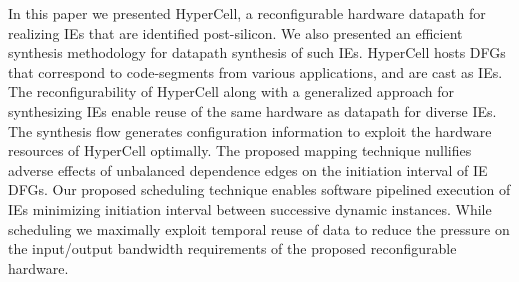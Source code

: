 In this paper we presented HyperCell, a reconfigurable hardware datapath for realizing IEs that are identified post-silicon. We also presented an efficient synthesis methodology for datapath synthesis of such IEs. 
HyperCell hosts DFGs that correspond to code-segments from various applications, and are cast as IEs. 
The reconfigurability of HyperCell along with a generalized approach for synthesizing IEs enable reuse of the same hardware as datapath for diverse IEs. 
The synthesis flow generates configuration information to exploit the hardware resources of HyperCell optimally. 
The proposed mapping technique nullifies adverse effects of unbalanced dependence edges on the initiation interval of IE DFGs.  
Our proposed scheduling technique enables software pipelined execution of IEs minimizing initiation interval between successive dynamic instances.
While scheduling we maximally exploit temporal reuse of data to reduce the pressure on the input/output bandwidth requirements of the proposed reconfigurable hardware. 

